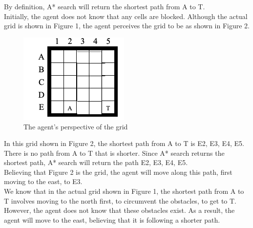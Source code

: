 \documentclass{article}
\begin{document}
By definition, A* search will return the shortest path from A to T.\\

Initially, the agent does not know that any cells are blocked. Although the actual grid is shown in Figure 1, the agent perceives the grid to be as shown in Figure 2.  \\

\begin{figure}[h!]
  \includegraphics[]{p1_1.png}
  \caption{The agent's perspective of the grid }
\end{figure}

In this grid shown in Figure 2, the shortest path from  A to T is E2, E3, E4, E5. There is no path from A to T that is shorter. Since A* search returns the shortest path, A* search will return the path E2, E3, E4, E5.\\

Believing that Figure 2 is the grid, the agent will move along this path, first moving to the east, to E3. \\

We know that in the actual grid shown in Figure 1, the shortest path from A to T involves moving to the north first, to circumvent the obstacles, to get to T. However, the agent does not know that these obstacles exist. As a result, the agent will move to the east, believing that it is following a shorter path. \\
\end{document}
